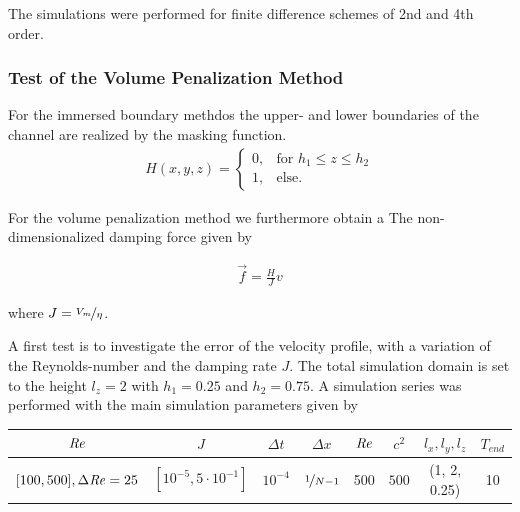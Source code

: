 The simulations were performed for finite difference schemes of 2nd and 4th order.

\subsubsection{Test of the Volume Penalization Method}


For the immersed boundary methdos the upper- and lower boundaries of the channel are realized by the masking function.
\begin{align}
H(x, y, z) = \begin{cases}
                    0, & \text{for \  }  h_1 \leq z \leq h_2 \\
                    1, & \text{else}.
             \end{cases}
\end{align}

For the volume penalization method we furthermore obtain a
The non-dimensionalized damping force  given by

\begin{align}
    \vec{f} = \frac{H}{J}v
\end{align}

where $J = \nicefrac{V_{m}}{\eta}$.

\clearpage

A first test is to investigate the error of the velocity profile, with a variation of the Reynolds-number and the damping rate $J$.
The total simulation domain is set to the height $l_z=2$ with $h_1=0.25$ and $h_2=0.75$.
A simulation series was performed with the main simulation parameters given by


\begin{center}
\vspace*{0.7ex}
\begin{tabular}{c|c|c|c|c|c|c|c }
 $ \mbox{\textit{Re}}  $                      & $J$ &  $\Delta t$ & $\Delta x$            & $\mbox{\textit{Re}}$  & $c^2$   & $l_x, l_y, l_z$ & $T_{end}$\\
\hline
 $[100, 500], \Delta \mbox{\textit{Re}} = 25 $& $[10^{-5}, 5\cdot10^{-1}]  $ &  $10^{-4}$ & $\nicefrac{1}{N - 1}$ & 500     & $500$   & (1, 2, 0.25)  & 10\\
\end{tabular}
\vspace*{0.7ex}
\end{center}

